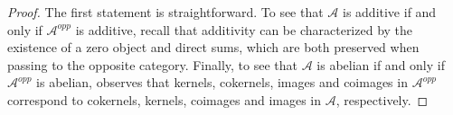 \documentclass[10pt,a4paper]{amsart}
\theoremstyle{plain}
\theoremstyle{definition}
\theoremstyle{remark}
\numberwithin{equation}{subsection}
\begin{document}
\begin{proof}
The first statement is straightforward.
To see that $\mathcal{A}$ is additive if and only if $\mathcal{A}^{opp}$
is additive, recall that additivity can be characterized by
the existence of a zero object and direct sums, which are both
preserved when passing to the opposite category.
Finally, to see that
$\mathcal{A}$ is abelian if and only if $\mathcal{A}^{opp}$ is abelian,
observes that kernels, cokernels, images and coimages in
$\mathcal{A}^{opp}$ correspond to
cokernels, kernels, coimages and images in $\mathcal{A}$,
respectively.
\end{proof}
\end{document}
